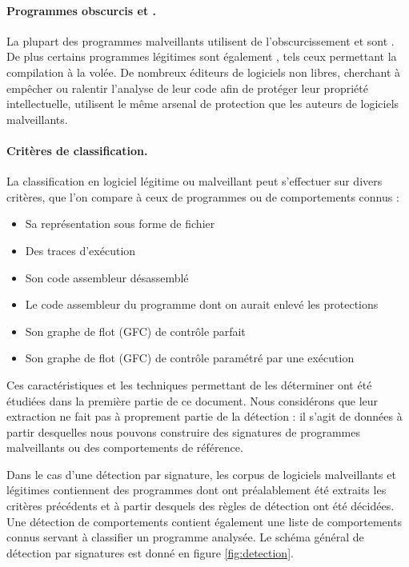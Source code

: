 \paragraph{Programmes obscurcis et \sms.}
La plupart des programmes malveillants utilisent de l'obscurcissement et sont \sms.
De plus certains programmes légitimes sont également \sms, tels ceux permettant la compilation à la volée.
De nombreux éditeurs de logiciels non libres, cherchant à empêcher ou ralentir l'analyse de leur code afin de protéger leur propriété intellectuelle, utilisent le même arsenal de protection que les auteurs de logiciels malveillants.

\paragraph{Critères de classification.}
La classification en logiciel légitime ou malveillant peut s'effectuer sur divers critères, que l'on compare à ceux de programmes ou de comportements connus :
\begin{itemize}
 \item Sa représentation sous forme de fichier
 \item Des traces d'exécution
 \item Son code assembleur désassemblé
 \item Le code assembleur du programme dont on aurait enlevé les protections
 \item Son graphe de flot (GFC) de contrôle parfait
 \item Son graphe de flot (GFC) de contrôle paramétré par une exécution
\end{itemize}

Ces caractéristiques et les techniques permettant de les déterminer ont été étudiées dans la première partie de ce document.
Nous considérons que leur extraction ne fait pas à proprement partie de la détection : il s'agit de données à partir desquelles nous pouvons construire des signatures de programmes malveillants ou des comportements de référence.

Dans le cas d'une détection par signature, les corpus de logiciels malveillants et légitimes contiennent des programmes dont ont préalablement été extraits les critères précédents et à partir desquels des règles de détection ont été décidées.
Une détection de comportements contient également une liste de comportements connus servant à classifier un programme analysée. Le schéma général de détection par signatures est donné en figure \ref{fig:detection}.

